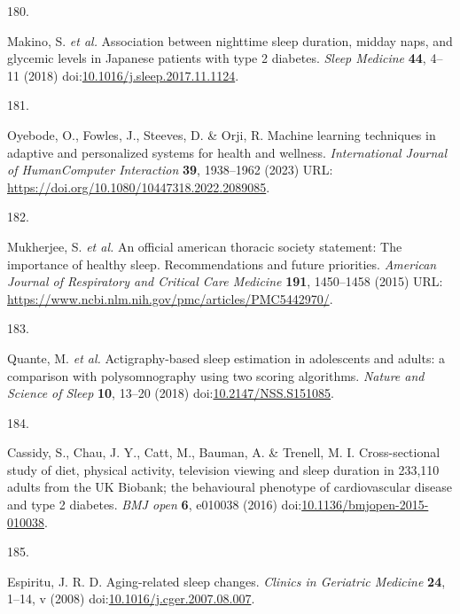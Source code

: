 \documentclass[
  10pt,
]{scrbook}
\newlength{\cslhangindent}
\newlength{\csllabelwidth}
\newlength{\cslentryspacingunit} %
\newenvironment{CSLReferences}[2] %
 {%
  \setlength{\parindent}{0pt}
  \ifodd #1
  \let\oldpar\par
  \def\par{\hangindent=\cslhangindent\oldpar}
  \fi
  \setlength{\parskip}{#2\cslentryspacingunit}
 }%
 {}
\newcommand{\CSLLeftMargin}[1]{\parbox[t]{\csllabelwidth}{#1}}
\newcommand{\CSLRightInline}[1]{\parbox[t]{\linewidth - \csllabelwidth}{#1}\break}
\let\originaltextbf\textbf
\renewcommand{\textbf}[1]{\textcolor{color1}{\textsf{\originaltextbf{#1}}}}
\begin{document}
\begin{CSLReferences}{0}{0}
\leavevmode{}%
\CSLLeftMargin{180. }%
\CSLRightInline{Makino, S. \emph{et al.} Association between nighttime
sleep duration, midday naps, and glycemic levels in Japanese patients
with type 2 diabetes. \emph{Sleep Medicine} \textbf{44}, 4--11 (2018)
doi:\href{https://doi.org/10.1016/j.sleep.2017.11.1124}{10.1016/j.sleep.2017.11.1124}.}

\leavevmode{}%
\CSLLeftMargin{181. }%
\CSLRightInline{Oyebode, O., Fowles, J., Steeves, D. \& Orji, R. Machine
learning techniques in adaptive and personalized systems for health and
wellness. \emph{International Journal of Human{\textendash}Computer
Interaction} \textbf{39}, 1938--1962 (2023) URL:
\url{https://doi.org/10.1080/10447318.2022.2089085}.}

\leavevmode{}%
\CSLLeftMargin{182. }%
\CSLRightInline{Mukherjee, S. \emph{et al.} An official american
thoracic society statement: The importance of healthy sleep.
Recommendations and future priorities. \emph{American Journal of
Respiratory and Critical Care Medicine} \textbf{191}, 1450--1458 (2015)
URL: \url{https://www.ncbi.nlm.nih.gov/pmc/articles/PMC5442970/}.}

\leavevmode{}%
\CSLLeftMargin{183. }%
\CSLRightInline{Quante, M. \emph{et al.} Actigraphy-based sleep
estimation in adolescents and adults: a comparison with polysomnography
using two scoring algorithms. \emph{Nature and Science of Sleep}
\textbf{10}, 13--20 (2018)
doi:\href{https://doi.org/10.2147/NSS.S151085}{10.2147/NSS.S151085}.}

\leavevmode{}%
\CSLLeftMargin{184. }%
\CSLRightInline{Cassidy, S., Chau, J. Y., Catt, M., Bauman, A. \&
Trenell, M. I. Cross-sectional study of diet, physical activity,
television viewing and sleep duration in 233,110 adults from the UK
Biobank; the behavioural phenotype of cardiovascular disease and type 2
diabetes. \emph{BMJ open} \textbf{6}, e010038 (2016)
doi:\href{https://doi.org/10.1136/bmjopen-2015-010038}{10.1136/bmjopen-2015-010038}.}

\leavevmode{}%
\CSLLeftMargin{185. }%
\CSLRightInline{Espiritu, J. R. D. Aging-related sleep changes.
\emph{Clinics in Geriatric Medicine} \textbf{24}, 1--14, v (2008)
doi:\href{https://doi.org/10.1016/j.cger.2007.08.007}{10.1016/j.cger.2007.08.007}.}


\end{CSLReferences}
\end{document}
